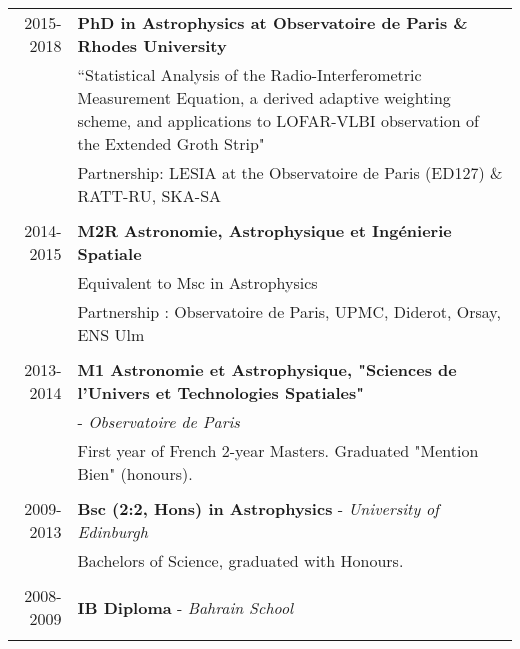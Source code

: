 \documentclass[10pt]{article} %
\begin{document}
\begin{tabular}{r|p{12.5cm}}
\textsc{2015-2018} & \textbf{PhD in Astrophysics at Observatoire de Paris \& Rhodes University}\\
& ``Statistical Analysis of the Radio-Interferometric Measurement Equation,
a derived adaptive weighting scheme, and applications to LOFAR-VLBI
observation of the Extended Groth Strip"\\
& Partnership: LESIA at the Observatoire de Paris (ED127) \& RATT-RU, SKA-SA\\
\multicolumn{2}{c}{} \\

\textsc{2014-2015} & \textbf{M2R Astronomie, Astrophysique et Ingénierie Spatiale} \\
& Equivalent to Msc in Astrophysics \\
& Partnership : Observatoire de Paris, UPMC, Diderot, Orsay, ENS Ulm\\
\multicolumn{2}{c}{} \\

\textsc{2013-2014} & \textbf{M1 Astronomie et Astrophysique, "Sciences de l’Univers et Technologies Spatiales"} \\& - \textit{Observatoire de Paris} \\
& First year of French 2-year Masters. Graduated "Mention Bien" (honours). \\
\multicolumn{2}{c}{} \\

\textsc{2009-2013} & \textbf{Bsc (2:2, Hons) in Astrophysics} - \textit{University of Edinburgh} \\
& Bachelors of Science, graduated with Honours.\\
\multicolumn{2}{c}{} \\

\textsc{2008-2009} & \textbf{IB Diploma} - \textit{Bahrain School} \\
\multicolumn{2}{c}{} \\

\end{tabular}


\end{document}
